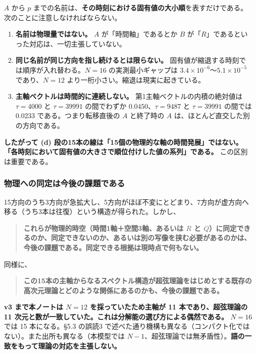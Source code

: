 \documentclass[
  10pt,
]{ltjsarticle}
\providecommand{\tightlist}{%
  \setlength{\itemsep}{0pt}\setlength{\parskip}{0pt}}
\begin{document}
\(A\) から \(p\)
までの名前は、\textbf{その時刻における固有値の大小順}を表すだけである。次のことに注意しなければならない。

\begin{enumerate}
\def\labelenumi{\arabic{enumi}.}
\tightlist
\item
  \textbf{名前は物理量ではない。} \(A\) が「時間軸」であるとか \(B\)
  が「\(R\)」であるといった対応は、一切主張していない。
\item
  \textbf{同じ名前が同じ方向を指し続けるとは限らない。}
  固有値が縮退する時刻では順序が入れ替わる。\(N=16\)
  の実測最小ギャップは \(3.4\times10^{-6}\)〜\(5.1\times10^{-5}\)
  であり、\(N=12\) より一桁小さい。縮退は現実に起きている。
\item
  \textbf{主軸ベクトルは時間的に連続しない。}
  第1主軸ベクトルの内積の絶対値は \(\tau = 4000\) と \(\tau = 39991\)
  の間でわずか \(0.0450\)、\(\tau = 9487\) と \(\tau = 39991\) の間では
  \(0.0233\) である。つまり転移直後の \(A\) と終了時の \(A\)
  は、ほとんど直交した別の方向である。
\end{enumerate}

\textbf{したがって (d)
段の15本の線は「15個の物理的な軸の時間発展」ではない。「各時刻において固有値の大きさで順位付けした値の系列」である。}
この区別は重要である。

\subsubsection{物理への同定は今後の課題である}\label{ux7269ux7406ux3078ux306eux540cux5b9aux306fux4ecaux5f8cux306eux8ab2ux984cux3067ux3042ux308b}

15方向のうち3方向が急拡大し、5方向がほぼ不変にとどまり、7方向が虚方向へ移る（うち3本は往復）という構造が得られた。しかし、

\begin{quote}
\textbf{これらが物理的時空（時間1軸＋空間3軸、あるいは \(R\) と
\(Q\)）に同定できるのか、同定できないのか、あるいは別の写像を挟む必要があるのかは、今後の課題である。同定できる根拠は現時点で何もない。}
\end{quote}

同様に、

\begin{quote}
\textbf{この15本の主軸からなるスペクトル構造が超弦理論をはじめとする既存の高次元理論とどのような関係にあるのかも、今後の課題である。}
\end{quote}

\textbf{v3 まで本ノートは \(N=12\) を採っていたため主軸が 11
本であり、超弦理論の 11
次元と数が一致していた。これは分解能の選び方による偶然である。} \(N=16\)
では 15 本になる。§5.3 の誤読3
で述べた通り機構も異なる（コンパクト化ではない）。また出所も異なる（本模型では
\(N-1\)、超弦理論では無矛盾性）。\textbf{語の一致をもって理論の対応を主張しない。}
\end{document}
